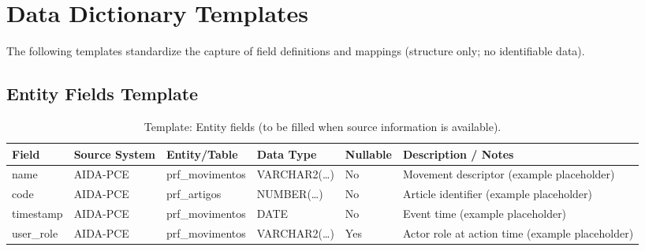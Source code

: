 \section{Data Dictionary Templates}
\begingroup\small
The following templates standardize the capture of field definitions and mappings (structure only; no identifiable data).

\subsection{Entity Fields Template}
\begin{table}[H]
    \centering
    \caption{Template: Entity fields (to be filled when source information is available).}
    \label{tab:template_entity_fields}
    {\setlength{\tabcolsep}{4pt}\small
    \begin{tabularx}{\textwidth}{@{}>{\raggedright\arraybackslash}p{2.7cm} >{\raggedright\arraybackslash}p{2.3cm} >{\raggedright\arraybackslash}p{2.7cm} >{\raggedright\arraybackslash}p{2.2cm} >{\centering\arraybackslash}p{1.6cm} >{\raggedright\arraybackslash}X@{}}
        \toprule
        \textbf{Field} & \textbf{Source System} & \textbf{Entity/Table} & \textbf{Data Type} & \textbf{Nullable} & \textbf{Description / Notes} \\
        \midrule
        name & AIDA-PCE & prf\_movimentos & VARCHAR2(\ldots) & No & Movement descriptor (example placeholder) \\
        code & AIDA-PCE & prf\_artigos & NUMBER(\ldots) & No & Article identifier (example placeholder) \\
        timestamp & AIDA-PCE & prf\_movimentos & DATE & No & Event time (example placeholder) \\
        user\_role & AIDA-PCE & prf\_movimentos & VARCHAR2(\ldots) & Yes & Actor role at action time (example placeholder) \\
        \bottomrule
    \end{tabularx}}
\end{table}

